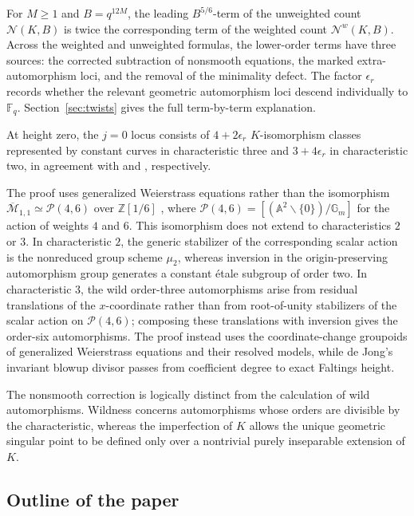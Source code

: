 \documentclass[a4paper,12pt]{amsart}
\theoremstyle{definition}
\newcommand{\Zb}{\mathbb{Z}}
\newcommand{\Fb}{\mathbb{F}}
\newcommand{\Nc}{\mathcal{N}}
\renewcommand{\setminus}{\smallsetminus}
\begin{document}
\smallskip

For $M\geq1$ and $B=q^{12M}$, the leading $B^{5/6}$-term of the unweighted count $\Nc(K,B)$ is twice the corresponding term of the weighted count $\Nc^w(K,B)$.  Across the weighted and unweighted formulas, the lower-order terms have three sources: the corrected subtraction of nonsmooth equations, the marked extra-automorphism loci, and the removal of the minimality defect.  The factor $\epsilon_r$ records whether the relevant geometric automorphism loci descend individually to $\Fb_q$.  Section~\ref{sec:twists} gives the full term-by-term explanation.

\medskip

At height zero, the $j=0$ locus consists of $4+2\epsilon_r$ $K$-isomorphism classes represented by constant curves in characteristic three and $3+4\epsilon_r$ in characteristic two, in agreement with \cite[Proposition~2.2]{KST} and \cite[Proposition~3.2]{KST}, respectively.

\medskip

The proof uses generalized Weierstrass equations rather than the isomorphism $\overline{\mathcal M}_{1,1}\simeq\mathcal P(4,6)$ over $\Zb[1/6]$ \cite[Section~1]{BPS}, where $\mathcal P(4,6)=[(\mathbb A^2\setminus\{0\})/\mathbb G_m]$ for the action of weights $4$ and $6$.  This isomorphism does not extend to characteristics $2$ or $3$.  In characteristic $2$, the generic stabilizer of the corresponding scalar action is the nonreduced group scheme $\mu_2$, whereas inversion in the origin-preserving automorphism group generates a constant \'etale subgroup of order two.  In characteristic $3$, the wild order-three automorphisms arise from residual translations of the $x$-coordinate rather than from root-of-unity stabilizers of the scalar action on $\mathcal P(4,6)$; composing these translations with inversion gives the order-six automorphisms.  The proof instead uses the coordinate-change groupoids of generalized Weierstrass equations and their resolved models, while de Jong's invariant blowup divisor passes from coefficient degree to exact Faltings height.

\medskip

The nonsmooth correction is logically distinct from the calculation of wild automorphisms.  Wildness concerns automorphisms whose orders are divisible by the characteristic, whereas the imperfection of $K$ allows the unique geometric singular point to be defined only over a nontrivial purely inseparable extension of $K$.

\subsection{Outline of the paper}
\end{document}
